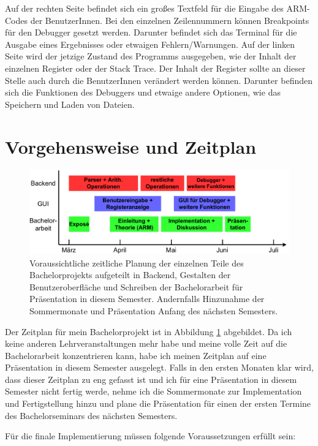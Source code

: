 \documentclass[a4paper, 11pt, onecolumn]{article}
\begin{document}
Auf der rechten Seite befindet sich ein großes Textfeld für die Eingabe des ARM-Codes der BenutzerInnen. Bei den einzelnen Zeilennummern können Breakpoints für den Debugger gesetzt werden. Darunter befindet sich das Terminal für die Ausgabe eines Ergebnisses oder etwaigen Fehlern/Warnungen. Auf der linken Seite wird der jetzige Zustand des Programms ausgegeben, wie der Inhalt der einzelnen Register oder der Stack Trace. Der Inhalt der Register sollte an dieser Stelle auch durch die BenutzerInnen verändert werden können. Darunter befinden sich die Funktionen des Debuggers und etwaige andere Optionen, wie das Speichern und Laden von Dateien.


\section{Vorgehensweise und Zeitplan}

\begin{figure}[!htb]	
	\includegraphics[width=0.8\paperwidth]{data/timeline}
	\caption{Voraussichtliche zeitliche Planung der einzelnen Teile des Bachelorprojekts aufgeteilt in Backend, Gestalten der Benutzeroberfläche und Schreiben der Bachelorarbeit für Präsentation in diesem Semester. Andernfalls Hinzunahme der Sommermonate und Präsentation Anfang des nächsten Semesters.}
	\label{timeline}
\end{figure}

Der Zeitplan für mein Bachelorprojekt ist in Abbildung \ref{timeline} abgebildet. Da ich keine anderen Lehrveranstaltungen mehr habe und meine volle Zeit auf die Bachelorarbeit konzentrieren kann, habe ich meinen Zeitplan auf eine Präsentation in diesem Semester ausgelegt. Falls in den ersten Monaten klar wird, dass dieser Zeitplan zu eng gefasst ist und ich für eine Präsentation in diesem Semester nicht fertig werde, nehme ich die Sommermonate zur Implementation und Fertigstellung hinzu und plane die Präsentation für einen der ersten Termine des Bachelorseminars des nächsten Semesters.

Für die finale Implementierung müssen folgende Voraussetzungen erfüllt sein:
\end{document}
